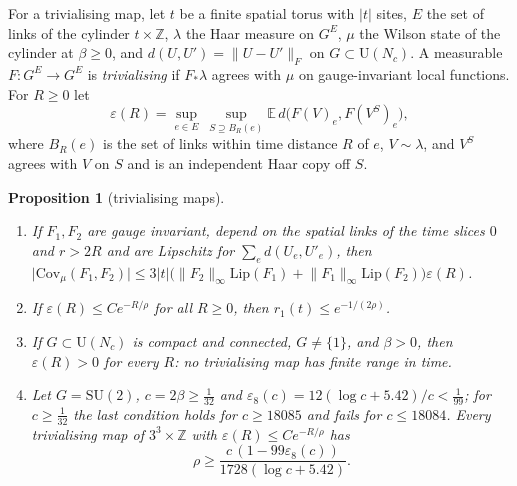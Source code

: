 \documentclass[11pt,a4paper]{amsart}
\newtheorem{proposition}[theorem]{Proposition}
\theoremstyle{definition}
\theoremstyle{remark}
\numberwithin{equation}{section}
\newcommand{\Z}{\mathbb{Z}}          %
\newcommand{\norm}[1]{\lVert #1\rVert}     %
\newcommand{\abs}[1]{\lvert #1\rvert}      %
\newcommand{\SU}{\mathrm{SU}}              %
\newcommand{\U}{\mathrm{U}}                %
\begin{document}
For a trivialising map, let $t$ be a finite spatial torus with $\abs t$ sites, $E$ the set of links of the cylinder $t\times\Z$, $\lambda$ the Haar measure on $G^E$, $\mu$ the Wilson state of the cylinder at $\beta\ge0$, and $d(U,U')=\norm{U-U'}_F$ on $G\subset\U(N_c)$. A measurable $F\colon G^E\to G^E$ is \emph{trivialising} if $F_*\lambda$ agrees with $\mu$ on gauge-invariant local functions. For $R\ge0$ let
\[
\varepsilon(R)=\sup_{e\in E}\ \sup_{S\supseteq B_R(e)}\mathbb E\,d\bigl(F(V)_e,F(V^S)_e\bigr),
\]
where $B_R(e)$ is the set of links within time distance $R$ of $e$, $V\sim\lambda$, and $V^S$ agrees with $V$ on $S$ and is an independent Haar copy off $S$.

\begin{proposition}[trivialising maps]\label{prop:trivialising-maps}
\begin{enumerate}[label=\textup{(\alph*)},leftmargin=*]
\item If $F_1,F_2$ are gauge invariant, depend on the spatial links of the time slices $0$ and $r>2R$ and are Lipschitz for $\sum_ed(U_e,U'_e)$, then $\abs{\mathrm{Cov}_\mu(F_1,F_2)}\le3\abs t\bigl(\norm{F_2}_\infty\mathrm{Lip}(F_1)+\norm{F_1}_\infty\mathrm{Lip}(F_2)\bigr)\varepsilon(R)$.
\item If $\varepsilon(R)\le Ce^{-R/\rho}$ for all $R\ge0$, then $r_1(t)\le e^{-1/(2\rho)}$.
\item If $G\subset\U(N_c)$ is compact and connected, $G\ne\{1\}$, and $\beta>0$, then $\varepsilon(R)>0$ for every $R$: no trivialising map has finite range in time.
\item Let $G=\SU(2)$, $c=2\beta\ge\frac1{32}$ and $\varepsilon_8(c)=12(\log c+5.42)/c<\frac1{99}$; for $c\ge\frac1{32}$ the last condition holds for $c\ge18085$ and fails for $c\le18084$. Every trivialising map of $3^3\times\Z$ with $\varepsilon(R)\le Ce^{-R/\rho}$ has
\[
\rho\ge\frac{c\,(1-99\varepsilon_8(c))}{1728(\log c+5.42)} .
\]
\end{enumerate}
\end{proposition}
\end{document}

